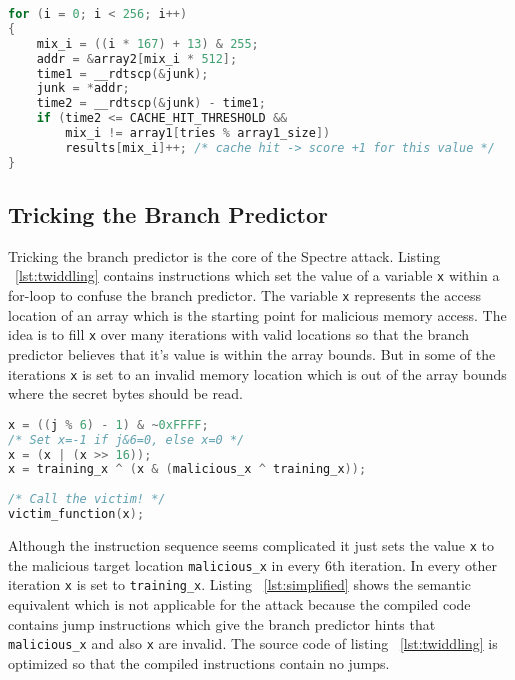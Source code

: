 \documentclass[a4paper,oneside,openright] {scrreprt}
\begin{document}
\begin{lstlisting}[language=C, caption=Spectre: Reload, label={lst:reload}]
for (i = 0; i < 256; i++)
{
    mix_i = ((i * 167) + 13) & 255;
    addr = &array2[mix_i * 512];
    time1 = __rdtscp(&junk);
    junk = *addr;
    time2 = __rdtscp(&junk) - time1;
    if (time2 <= CACHE_HIT_THRESHOLD &&
        mix_i != array1[tries % array1_size])
        results[mix_i]++; /* cache hit -> score +1 for this value */
}
\end{lstlisting}

\subsection{Tricking the Branch Predictor}
\label{ch:intro:motivation:A}

Tricking the branch predictor is the core of the Spectre attack. Listing ~\ref{lst:twiddling} contains instructions which
 set the value of a variable \texttt{x} within a for-loop to confuse the branch predictor.
The variable \texttt{x} represents the access location of an array which is the starting point for malicious memory access.
The idea is to fill \texttt{x} over many iterations with valid locations so that the branch predictor believes
that it's value is within the array bounds. But in some of the iterations \texttt{x} is set to an invalid memory location
which is out of the array bounds where the secret bytes should be read.

\begin{lstlisting}[language=C, caption=Spectre: Branch Predictor Tricking, label={lst:twiddling}]
x = ((j % 6) - 1) & ~0xFFFF;
/* Set x=-1 if j&6=0, else x=0 */
x = (x | (x >> 16));
x = training_x ^ (x & (malicious_x ^ training_x));
    
/* Call the victim! */
victim_function(x);
\end{lstlisting}

Although the instruction sequence seems complicated it just sets the value \texttt{x} to the malicious target location 
\texttt{malicious\_x} in every 6th iteration. In every other iteration \texttt{x} is set to \texttt{training\_x}.
Listing ~\ref{lst:simplified} shows the semantic equivalent which is not applicable for the attack because the compiled code
contains jump instructions which give the branch predictor hints that \texttt{malicious\_x} and also \texttt{x} are invalid.
The source code of listing ~\ref{lst:twiddling} is optimized so that the compiled instructions contain no jumps.
\end{document}

